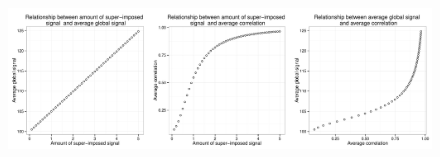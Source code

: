 \documentclass[a4paper]{article}\usepackage[]{graphicx}\usepackage[]{color}
\makeatletter
\def\maxwidth{ %
  \ifdim\Gin@nat@width>\linewidth
    \linewidth
  \else
    \Gin@nat@width
  \fi
}
\newenvironment{knitrout}{}{} %
\makeatother
\begin{document}
\begin{knitrout}
\color{fgcolor}\begin{figure}[]


{\centering \includegraphics[width=\maxwidth]{GSFigs/GSGSCorandAmount2} 

}

\caption[]{\label{fig:GSCorandAmount2}}
\end{figure}


\end{knitrout}
\end{document}
